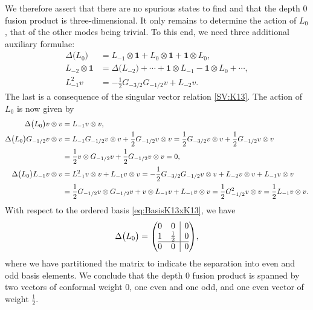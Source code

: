 \documentclass[a4paper,reqno,12pt]{report}
\makeatletter
\theoremstyle{definition}
\numberwithin{equation}{section}
\newenvironment{amatrix}[1]{\left( \begin{array}{@{}#1@{}}}{\end{array} \right)}
\let\originalleft\left     %
\let\originalright\right
\renewcommand{\left}{\mathopen{}\mathclose\bgroup\originalleft}
\renewcommand{\right}{\aftergroup\egroup\originalright}
\newcommand{\wun}{\mathbf{1}}  %
\newcommand{\coproductsymb}{\Delta}                                                %
\newcommand{\coproduct}[1]{\coproductsymb \bigl( #1 \bigr)}                        %
\newcommand{\sv}{singular vector}
\theoremstyle{plain}
\makeatother
\begin{document}
We therefore assert that there are no spurious states to find and that the depth $0$ fusion product is three-dimensional.  It only remains to determine the action of $L_0$, that of the other modes being trivial.  To this end, we need three additional auxiliary formulae:
\begin{subequations}
\begin{align}
\coproduct{L_0} &= L_{-1} \otimes \wun + L_0 \otimes \wun + \wun \otimes L_0, \label{M1:L0} \\
L_{-2} \otimes \wun &= \coproduct{L_{-2}} + \cdots + \wun \otimes L_{-1} - \wun \otimes L_0 + \cdots, \label{M3:L-2} \\
L_{-1}^2 v &= -\frac{1}{2} G_{-3/2} G_{-1/2} v + L_{-2} v. \label{SV':K13}
\end{align}
\end{subequations}
The last is a consequence of the \sv{} relation \eqref{SV:K13}.  The action of $L_0$ is now given by
\begin{subequations}
\begin{align}
\coproduct{L_0} v \otimes v &= L_{-1} v \otimes v, \\
\coproduct{L_0} G_{-1/2} v \otimes v &= L_{-1} G_{-1/2} v \otimes v + \frac{1}{2} G_{-1/2} v \otimes v = \frac{1}{2} G_{-3/2} v \otimes v + \frac{1}{2} G_{-1/2} v \otimes v \notag \\
&= \frac{1}{2} v \otimes G_{-1/2} v + \frac{1}{2} G_{-1/2} v \otimes v = 0, \\
\coproduct{L_0} L_{-1} v \otimes v &= L_{-1}^2 v \otimes v + L_{-1} v \otimes v = -\frac{1}{2} G_{-3/2} G_{-1/2} v \otimes v + L_{-2} v \otimes v + L_{-1} v \otimes v \notag \\
&= \frac{1}{2} G_{-1/2} v \otimes G_{-1/2} v + v \otimes L_{-1} v + L_{-1} v \otimes v = \frac{1}{2} G_{-1/2}^2 v \otimes v = \frac{1}{2} L_{-1} v \otimes v.
\end{align}
\end{subequations}
With respect to the ordered basis \eqref{eq:BasisK13xK13}, we have
\begin{equation}
\coproduct{L_0} = 
\begin{amatrix}{cc|c}
0 & 0           & 0 \\
1 & \frac{1}{2} & 0 \\
\hline
0 & 0           & 0
\end{amatrix}
,
\end{equation}
where we have partitioned the matrix to indicate the separation into even and odd basis elements.  We conclude that the depth $0$ fusion product is spanned by two vectors of conformal weight $0$, one even and one odd, and one even vector of weight $\frac{1}{2}$.
\end{document}
